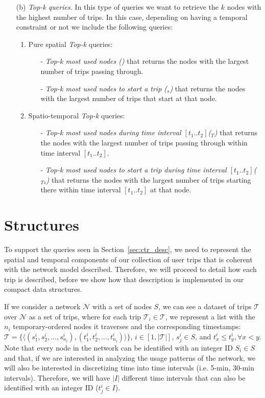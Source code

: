 \begin{itemize}
		\item[(b)] {\em Top-k queries.} In this type of queries we want to retrieve the $k$ nodes with the highest number of trips. In this case, depending on having a temporal constraint or not we include the following queries:
		\begin{enumerate}
			\item Pure spatial {\em Top-k} queries:
			\begin{itemize}
				\item[-] {\em Top-k most used nodes (\topK)} that returns the nodes with the largest number of trips passing through.
				\item[-] {\em Top-k most used nodes to start a trip (\topK$_s$)} that returns the nodes with the largest number of trips that start at that node.
			\end{itemize}
			
			\item Spatio-temporal {\em Top-k}  queries:
			\begin{itemize}
				\item[-] {\em Top-k most used nodes during time interval $[t_1..t_2]$(\topK$_T$)} that returns the nodes with the largest number of trips passing through within time interval $[t_1..t_2]$. 
				\item[-] {\em Top-k most used nodes to start a trip during time interval $[t_1..t_2]$(\topK$_{Ts}$)} that returns the nodes with the largest number of trips starting there within time interval $[t_1..t_2]$ at that node.
			\end{itemize}
		\end{enumerate}
	\end{itemize}

\section{Structures}
\label{sec:ctr_str}
	To support the queries seen in Section~\ref{sec:ctr_desc}, we need to represent the spatial and temporal components of our collection of user trips that is coherent with the network model described. Therefore, we will proceed to detail how each trip is described, before we show how that description is implemented in our compact data structures.

	If we consider a network $\mathcal{N}$ with a set of nodes $S$, 
	we can see a dataset of trips $\mathcal{T}$ over $\mathcal{N}$ as 
	a set of trips, where for each trip $\mathcal{T}_i \in \mathcal{T}$, we represent a list with the 
	$n_i$
	temporary-ordered nodes it traverses and the corresponding timestamps: 
	$\mathcal{T}= \{ \langle (s^i_1, s^i_2, \dots,  s^i_{n_i}),(t^i_1, t^i_2, \dots,  t^i_{n_i}) \rangle\}$, $i\in[1,|\mathcal{T}|]$, 
	$s^i_j \in S$, and $t^i_{x} \leq t^i_y, \forall x < y$. 
	Note that every node in the network can be identified with an integer ID $S_i \in S$ and that, if we are interested in
	analyzing the usage patterns of the network, we will also be interested in discretizing time into 
	time intervals (i.e. 5-min, 30-min intervals). Therefore,
	we will have $|I|$ different time intervals that can also be identified with an
	integer ID ($t^i_j \in I$).

